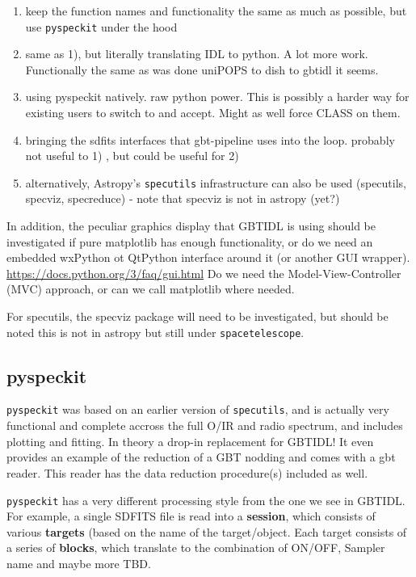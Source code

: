 \documentclass[12pt,a4paper]{article}
\begin{document}
\begin{enumerate}
\item
  keep the function names and functionality the same as much as possible,
    but use {\tt pyspeckit} under the hood

\item
  same as 1), but literally  translating IDL to python. A lot more work.
  Functionally the same as  was done uniPOPS to dish to gbtidl it seems.

\item
  using pyspeckit natively. raw python power. This is possibly a harder way for
  existing users to switch to and accept. Might as well force CLASS on them.
  
\item
  bringing the sdfits interfaces that gbt-pipeline uses into the loop.
  probably not useful to 1) , but could be useful for 2)

\item
  alternatively, Astropy's {\tt specutils} infrastructure can also be used
  (specutils, specviz, specreduce) - note that specviz is not in astropy (yet?)

\end{enumerate}

In addition, the peculiar graphics display that GBTIDL is using should
be investigated if pure matplotlib has enough functionality, or do we
need an embedded wxPython ot QtPython interface around it (or another
GUI wrapper).  \url{https://docs.python.org/3/faq/gui.html}
Do we need the Model-View-Controller (MVC) approach, or can we call
matplotlib where needed.

For specutils, the specviz package will need to be investigated, but
should be noted this is not in astropy but still under
{\tt spacetelescope}.

\subsection{pyspeckit}

{\tt pyspeckit} was based on an earlier version of {\tt specutils},
and is actually very functional and complete accross the full
O/IR and radio spectrum, and includes plotting and fitting. In theory
a drop-in replacement for GBTIDL! It even provides an example of the reduction
of a GBT nodding and comes with a gbt reader. This reader has the
data reduction procedure(s) included as well.

{\tt pyspeckit} has a very different processing style from the one we
see in GBTIDL. For example, a single SDFITS file is read into a
{\bf  session}, which consists of various {\bf targets} (based on the name
of the target/object. Each target consists of a series of {\bf blocks},
which translate to the combination of ON/OFF, Sampler
name and maybe more TBD.
\end{document}
